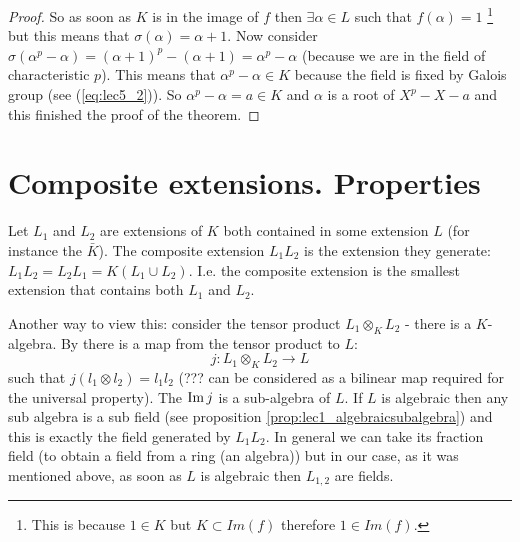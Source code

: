 \begin{theorem}
\begin{proof}
    So as soon as $K$ is in the image of $f$ then $\exists \alpha \in L$
    such that $f\left(\alpha\right) = 1$
    \footnote{
      This is because $1 \in K$ but $K \subset Im\left(f\right)$ therefore
      $1 \in Im\left(f\right)$.
    }
    but this means that
    $\sigma\left(\alpha\right) = \alpha + 1$. Now consider
    $\sigma\left(\alpha^p - \alpha\right) =
    \left(\alpha + 1\right)^p - \left(\alpha + 1\right) = \alpha^p -
    \alpha$ (because we are in the field of characteristic $p$). This
    means that $\alpha^p - \alpha \in K$ because the field is fixed by
    Galois group (see (\ref{eq:lec5_2})). So
    $\alpha^p - \alpha =  a \in K$ and $\alpha$ is a root of $X^p - X
    - a$ and this finished the proof of the theorem.
  \end{proof}
  \label{thm:lec7_1}
\end{theorem}

\section{Composite extensions. Properties}

\begin{definition}
  Let $L_1$ and $L_2$ are extensions of $K$ both contained in some
  extension $L$ (for instance the 
  $\bar{K}$). The composite extension $L_1 L_2$ is the extension they
  generate: $L_1 L_2 = L_2 L_1 = K\left(L_1 \cup L_2\right)$. I.e. the
  composite extension is the smallest extension that contains both
  $L_1$ and $L_2$.
  \label{def:compositeextension}
\end{definition}

Another way to view this: consider the tensor product $L_1 \otimes_K
L_2$ - there is a $K$-algebra. By 
there is a map from the tensor product to $L$:
\[
j: L_1 \otimes_K L_2 \to L  
\]
such that $j\left(l_1 \otimes l_2\right) = l_1 l_2$ (??? can be considered
as a bilinear map required for the universal property). The
 $\operatorname{Im} j$ is a sub-algebra of $L$. If $L$ is
algebraic then any sub algebra is a sub field (see proposition
\ref{prop:lec1_algebraicsubalgebra}) and this 
is exactly the field generated by $L_1 L_2$. In general we can take
its fraction field (to obtain a field from a ring (an algebra)) but in
our case, as it was mentioned above, as soon as $L$ is algebraic then
$L_{1,2}$ are fields.


